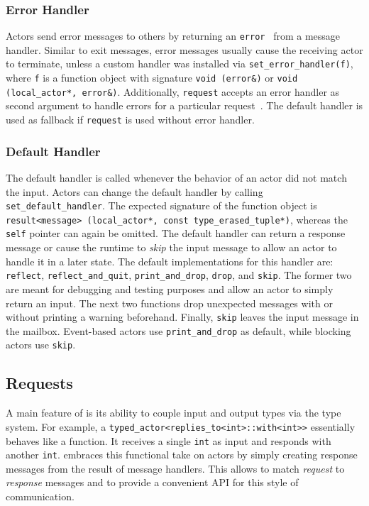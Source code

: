 \subsubsection{Error Handler}
\label{error-message}

Actors send error messages to others by returning an \lstinline^error^~ from a message handler. Similar to exit messages, error messages usually cause the receiving actor to terminate, unless a custom handler was installed via \lstinline^set_error_handler(f)^, where \lstinline^f^ is a function object with signature \lstinline^void (error&)^ or \lstinline^void (local_actor*, error&)^. Additionally, \lstinline^request^ accepts an error handler as second argument to handle errors for a particular request~. The default handler is used as fallback if \lstinline^request^ is used without error handler. 

\subsubsection{Default Handler}
\label{default-handler}

The default handler is called whenever the behavior of an actor did not match the input. Actors can change the default handler by calling \lstinline^set_default_handler^. The expected signature of the function object is \lstinline^result<message> (local_actor*, const type_erased_tuple*)^, whereas the \lstinline^self^ pointer can again be omitted. The default handler can return a response message or cause the runtime to \emph{skip} the input message to allow an actor to handle it in a later state. The default implementations for this handler are: \lstinline^reflect^, \lstinline^reflect_and_quit^, \lstinline^print_and_drop^, \lstinline^drop^, and \lstinline^skip^. The former two are meant for debugging and testing purposes and allow an actor to simply return an input. The next two functions drop unexpected messages with or without printing a warning beforehand. Finally, \lstinline^skip^ leaves the input message in the mailbox. Event-based actors use \lstinline^print_and_drop^ as default, while blocking actors use \lstinline^skip^.

\subsection{Requests}
\label{request}

A main feature of \lib is its ability to couple input and output types via the type system. For example, a \lstinline^typed_actor<replies_to<int>::with<int>>^ essentially behaves like a function. It receives a single \lstinline^int^ as input and responds with another \lstinline^int^. \lib embraces this functional take on actors by simply creating response messages from the result of message handlers. This allows \lib to match \emph{request} to \emph{response} messages and to provide a convenient API for this style of communication.

